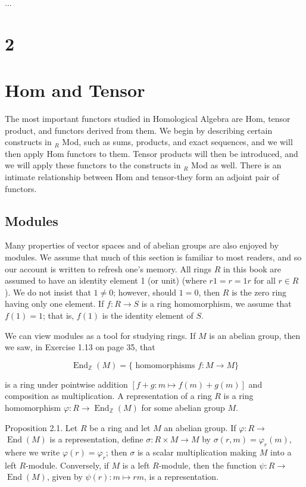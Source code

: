 \documentclass[10pt, letterpaper]{article}
\begin{document}
...



\pagebreak


\section*{2}
\section*{Hom and Tensor}


The most important functors studied in Homological Algebra are Hom, tensor product, and functors derived from them. We begin by describing certain constructs in ${ }_{R}$ Mod, such as sums, products, and exact sequences, and we will then apply Hom functors to them. Tensor products will then be introduced, and we will apply these functors to the constructs in ${ }_{R}$ Mod as well. There is an intimate relationship between Hom and tensor-they form an adjoint pair of functors.




\subsection*{Modules}


Many properties of vector spaces and of abelian groups are also enjoyed by modules. We assume that much of this section is familiar to most readers, and so our account is written to refresh one's memory. All rings $R$ in this book are assumed to have an identity element 1 (or unit) (where $r 1=r=1 r$ for all $r \in R$ ). We do not insist that $1 \neq 0$; however, should $1=0$, then $R$ is the zero ring having only one element. If $f: R \rightarrow S$ is a ring homomorphism, we assume that $f(1)=1$; that is, $f(1)$ is the identity element of $S$.

We can view modules as a tool for studying rings. If $M$ is an abelian group, then we saw, in Exercise 1.13 on page 35, that

$$
\operatorname{End}_{\mathbb{Z}}(M)=\{\text { homomorphisms } f: M \rightarrow M\}
$$

is a ring under pointwise addition $[f+g: m \mapsto f(m)+g(m)]$ and composition as multiplication. A representation of a ring $R$ is a ring homomorphism $\varphi: R \rightarrow \operatorname{End}_{\mathbb{Z}}(M)$ for some abelian group $M$.

Proposition 2.1. Let $R$ be a ring and let $M$ an abelian group. If $\varphi: R \rightarrow$ $\operatorname{End}(M)$ is a representation, define $\sigma: R \times M \rightarrow M$ by $\sigma(r, m)=\varphi_{r}(m)$, where we write $\varphi(r)=\varphi_{r}$; then $\sigma$ is a scalar multiplication making $M$ into a left $R$-module. Conversely, if $M$ is a left $R$-module, then the function $\psi: R \rightarrow$ $\operatorname{End}(M)$, given by $\psi(r): m \mapsto r m$, is a representation.
\end{document}

